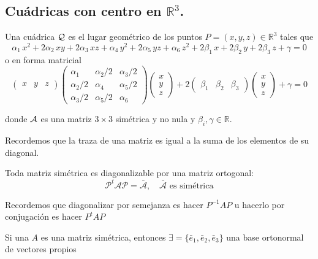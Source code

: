 \subsection{Cuádricas con centro en $\mathbb{R}^3$.}


Una cuádrica  $\cal Q$ es el lugar geométrico de los puntos $P=(x,y,z)\in\mathbb{R}^3$ tales que
\[
\alpha_1 \,x^2 + 2\alpha_2 \,x y + 2\alpha_3\,x z + \alpha_4 \,y^2 + 2 \alpha_5 \,y z + \alpha_6 \,z^2
+ 2\beta_1 \,x+ 2\beta_2 \,y +2 \beta_3 \,z + \gamma = 0
\]
o en forma matricial
\[
\left( \begin{array}{ccc}
x & y & z
 \end{array} \right)\begin{pmatrix}
 \alpha_1 & \alpha_2 / 2 &\alpha_3 / 2\\
 \alpha_2 / 2 & \alpha_4 &\alpha_5 / 2\\
 \alpha_3 / 2& \alpha_5 / 2& \alpha_6
\end{pmatrix}
\left(\begin{array}{c}
x \\
y \\
z
\end{array} \right)
+
 2\left( \begin{array}{ccc}
\beta_1 & \beta_2 & \beta_3
 \end{array} \right)
\left( \begin{array}{c}
x \\
y \\
z
 \end{array} \right)
+ \gamma = 0
\]

donde $\cal A$ es una matriz $3\times 3$ simétrica y no nula y $\beta_i, \gamma\in\mathbb{R}$.

\begin{nota}
	Recordemos que la traza de una matriz es igual a la suma de los elementos de su diagonal.
\end{nota}

\begin{nprop}
	Toda matriz simétrica es diagonalizable por una matriz ortogonal:
	\[
	\mathcal P ^t \mathcal A \mathcal P = \bar{ \mathcal A}, \quad \text{$\bar{\mathcal A}$ es simétrica}
	\]
\end{nprop}
\begin{nota}
	Recordemos que diagonalizar por semejanza es hacer $P^{-1}AP$ u hacerlo por conjugación es hacer $P^t A P$
\end{nota}

\begin{nth}
	Si una $A$ es una matriz simétrica, entonces $\exists = \{\bar e_1, \bar e_2, \bar e_3\}$ una base ortonormal de vectores propios
\end{nth}

